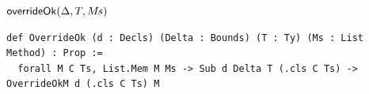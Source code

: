\begin{cmp}{$\mathsf{overrideOk}(\Delta,T,M\mkern-2mu s)$}
\begin{paperside}
\end{paperside}
\begin{leanside}
\begin{lstlisting}[style=leanside]
def OverrideOk (d : Decls) (Delta : Bounds) (T : Ty) (Ms : List Method) : Prop :=
  forall M C Ts, List.Mem M Ms -> Sub d Delta T (.cls C Ts) -> OverrideOkM d (.cls C Ts) M
\end{lstlisting}
\end{leanside}
\end{cmp}

